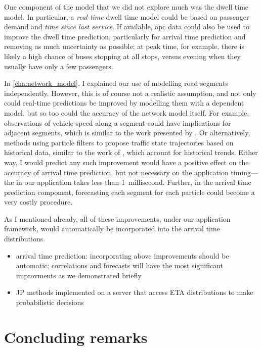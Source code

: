One component of the model that we did not explore much was the dwell time model. In particular, a \emph{real-time} dwell time model could be based on passenger demand and \emph{time since last service}. If available, \gls{apc} data could also be used to improve the dwell time prediction, particularly for arrival time prediction and removing as much uncertainty as possible; at peak time, for example, there is likely a high chance of buses stopping at all stops, versus evening when they usually have only a few passengers.



In \cref{cha:network_model}, I explained our use of modelling road segments independently. However, this is of course not a realistic assumption, and not only could real-time predictions be improved by modelling them with a dependent model, but so too could the accuracy of the network model itself. For example, observations of vehicle speed along a segment could have implications for adjacent segments, which is similar to the work presented by \citet{Julio_2016}. Or alternatively, methods using particle filters to propose traffic state trajectories based on historical data, similar to the work of \citet{Chen_2014}, which account for historical trends. Either way, I would predict any such improvement would have a positive effect on the accuracy of arrival time prediction, but not necessary on the application timing---the \kf{} in our application takes less than 1~millisecond. Further, in the arrival time prediction component, forecasting each segment for each particle could become a very costly procedure.


As I mentioned already, all of these improvements, under our application framework, would automatically be incorporated into the arrival time distributions.

\begin{itemize}
  \item arrival time prediction: incorporating above improvements should be automatic; correlations and forecasts will have the most significant improvments as we demonstrated briefly
  \item JP methods implemented on a server that access ETA distributions to make probabilistic decisions
\end{itemize}


\section{Concluding remarks}

